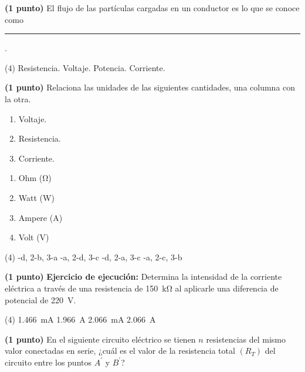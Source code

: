 \documentclass[12pt, letter]{exam}
\begin{document}
\begin{questions}
    \question \textbf{(1 punto)} El flujo de las partículas cargadas en un conductor es lo que se conoce como \rule{2cm}{0.1mm}.
    \begin{tasks}(4)
        \task Resistencia.
        \task Voltaje.
        \task Potencia.
        \task Corriente.
    \end{tasks}
    \question \textbf{(1 punto)} Relaciona las unidades de las siguientes cantidades, una columna con la otra.
    \\
    \begin{minipage}[t]{0.4\linewidth}
        \begin{enumerate}[label=\arabic*)]
            \item Voltaje.
            \item Resistencia.
            \item Corriente.
        \end{enumerate}
    \end{minipage}
    \begin{minipage}[t]{0.4\linewidth}
        \begin{enumerate}[label=\alph*)]
            \item Ohm (\si{\ohm})
            \item Watt (\si{\watt})
            \item Ampere (\si{\ampere})
            \item Volt (\si{\volt})
        \end{enumerate}
    \end{minipage}
    \begin{tasks}(4)
        -d, 2-b, 3-a
        -a, 2-d, 3-c
        -d, 2-a, 3-c
        -a, 2-c, 3-b
    \end{tasks}
    \question \textbf{(1 punto)} \label{Problema_02} \textbf{Ejercicio de ejecución: } Determina la intensidad de la corriente eléctrica a través de una resistencia de \SI{150}{\kilo\ohm} al aplicarle una diferencia de potencial de \SI{220}{\volt}.
    \begin{tasks}(4)
        \task \SI{1.466}{\milli\ampere}
        \task \SI{1.966}{\ampere}
        \task \SI{2.066}{\milli\ampere}
        \task \SI{2.066}{\ampere}
    \end{tasks}
    \question \textbf{(1 punto)} En el siguiente circuito eléctrico se tienen $n$ resistencias del mismo valor conectadas en serie, ¿cuál es el valor de la resistencia total $(R_{T})$ del circuito entre los puntos $A^{\prime}$ y $B^{\prime}$?
    \begin{center}

\end{center}
\end{questions}
\end{document}

